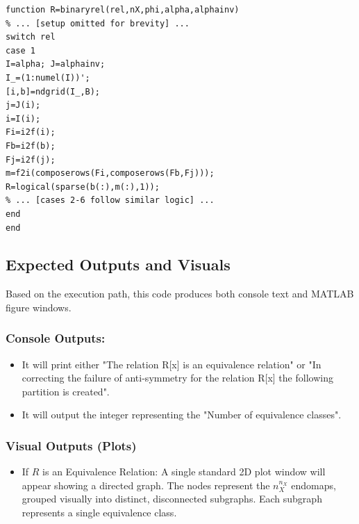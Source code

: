 \begin{lstlisting}
function R=binaryrel(rel,nX,phi,alpha,alphainv)
% ... [setup omitted for brevity] ...
switch rel
case 1 
I=alpha; J=alphainv; 
I_=(1:numel(I))'; 
[i,b]=ndgrid(I_,B); 
j=J(i);   
i=I(i);   
Fi=i2f(i); 
Fb=i2f(b);
Fj=i2f(j);  
m=f2i(composerows(Fi,composerows(Fb,Fj))); 
R=logical(sparse(b(:),m(:),1));
% ... [cases 2-6 follow similar logic] ...
end 
end
\end{lstlisting}


\subsection*{\hspace*{0.2cm} Expected Outputs and Visuals}
Based on the execution path, this code produces both console text and MATLAB figure windows.

\subsubsection*{Console Outputs:}
         \begin{itemize}
            \item It will print either "The relation R[x] is an equivalence relation" or "In correcting the failure of anti-symmetry for the relation R[x] the following partition is created".
        \end{itemize}
        \begin{itemize}
         \item It will output the integer representing the "Number of equivalence classes".
        \end{itemize}

    \subsubsection*{Visual Outputs (Plots)}
        \begin{itemize}
            \item If $R$ is an Equivalence Relation: A single standard 2D plot window will appear showing a directed graph. The nodes represent the $n_X^{n_X}$ endomaps, grouped visually into distinct, disconnected subgraphs. Each subgraph represents a single equivalence class.
        \end{itemize}

